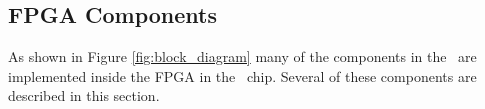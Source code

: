 \subsection{FPGA Components}
\label{sec:fpga}
As shown in Figure \ref{fig:block_diagram} many of the components in the \systemName~are 
implemented inside the FPGA in the \FPGADeviceFamily~chip.  Several of these components 
are described in this section.
